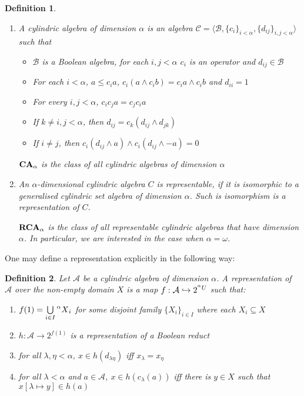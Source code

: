\documentclass[a4paper]{article}
\theoremstyle{defin}
\newtheorem{defin}{Definition}
\theoremstyle{theorem}
\theoremstyle{prop}
\theoremstyle{lemma}
\theoremstyle{fact}
\theoremstyle{ex}
\theoremstyle{col}
\begin{document}
\begin{defin}
\begin{enumerate}
    A generalised cylindric set algebra of dimension $\alpha$ is a subdirect of
    cylindric algebras that have dimension $\alpha$
    \item A cylindric algebra of dimension $\alpha$ is an algebra $\mathcal{C} = \langle \mathcal{B}, \{ c_i \}_{i < \alpha}, \{ d_{ij} \}_{i, j < \alpha} \rangle$ such that
    \begin{itemize}
      \item $\mathcal{B}$ is a Boolean algebra, for each $i, j < \alpha$ $c_i$ is an operator and $d_{ij} \in \mathcal{B}$
      \item For each $i < \alpha$, $a \leq c_i a$, $c_i (a \land c_i b) = c_i a \land c_i b$ and $d_{ii} = 1$
      \item For every $i, j < \alpha$, $c_i c_j a = c_j c_i a$
      \item If $k \neq i, j < \alpha$, then $d_{ij} = c_k (d_{ij} \land d_{jk})$
      \item If $i \neq j$, then $c_i (d_{ij} \land a) \land c_i (d_{ij} \land - a) = 0$
    \end{itemize}
    ${\bf CA}_{\alpha}$ is the class of all cylindric algebras of dimension $\alpha$
    \item An $\alpha$-dimensional cylindric algebra $C$ is representable, if it is isomorphic to a generalised cylindric set algebra
    of dimension $\alpha$. Such is isomorphism is a representation of $C$.

    ${\bf RCA}_{\alpha}$ is the class of all representable cylindric algebras that have dimension $\alpha$. In particular, we are interested in the case when $\alpha = \omega$.
  \end{enumerate}
\end{defin}

One may define a representation explicitly in the following way:

\begin{defin}
  Let $\mathcal{A}$ be a cylindric algebra of dimension $\alpha$. A representation of $\mathcal{A}$ over the non-empty domain $X$ is a map $f : \mathcal{A} \hookrightarrow 2^{\prescript{\alpha}{}U}$ such that:
  \begin{enumerate}
    \item $f(1) = \bigcup \limits_{i \in I} \prescript{\alpha}{}X_i$ for some disjoint family $\{X_i\}_{i \in I}$ where each $X_i \subseteq X$
    \item $h : \mathcal{A} \to 2^{f(1)}$ is a representation of a Boolean reduct
    \item for all $\lambda, \eta < \alpha$, $x \in h(d_{\lambda \eta})$ iff $x_{\lambda} = x_{\eta}$
    \item for all $\lambda < \alpha$ and $a \in \mathcal{A}$, $x \in h(c_{\lambda}(a))$ iff there is $y \in X$ such that $x[\lambda \mapsto y] \in h(a)$
  \end{enumerate}
\end{defin}
\end{document}
